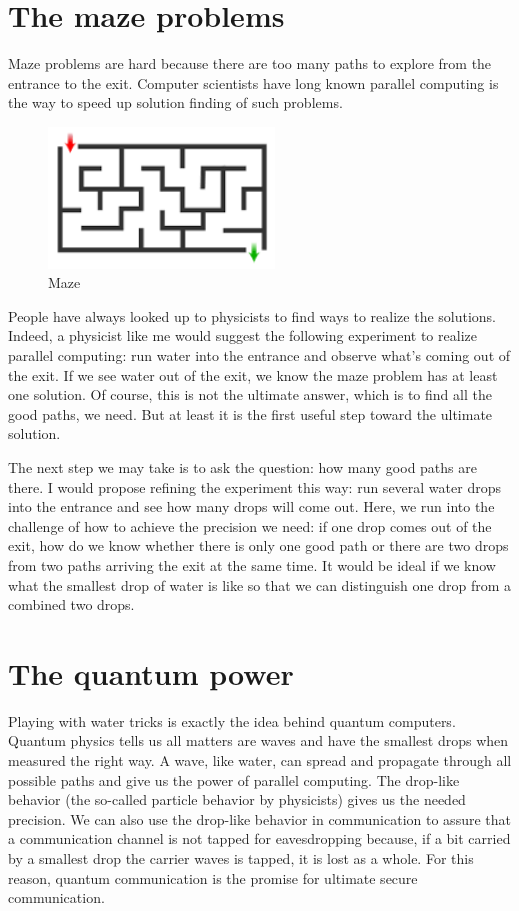 \documentclass{book}
\begin{document}
\section{The maze problems}
Maze problems are hard because there are too many paths to explore from the entrance to the exit. Computer scientists have long known parallel computing is the way to speed up solution finding of such problems.

\begin{figure}[ht]
\includegraphics[width=6cm]{maze.png}
\caption{Maze}
\label{Maze}
\end{figure}

People have always looked up to physicists to find ways to realize the solutions. Indeed, a physicist like me would suggest the following experiment to realize parallel computing: run water into the entrance and observe what's coming out of the exit. If we see water out of the exit, we know the maze problem has at least one solution. Of course, this is not the ultimate answer, which is to find all the good paths, we need. But at least it is the first useful step toward the ultimate solution.

The next step we may take is to ask the question: how many good paths are there. I would propose refining the experiment this way: run several water drops into the entrance and see how many drops will come out. Here, we run into the challenge of how to achieve the precision we need: if one drop comes out of the exit, how do we know whether there is only one good path or there are two drops from two paths arriving the exit at the same time. It would be ideal if we know what the smallest drop of water is like so that we can distinguish one drop from a combined two drops.

\section{The quantum power}
Playing with water tricks is exactly the idea behind quantum computers. Quantum physics tells us all matters are waves and have the smallest drops when measured the right way. A wave, like water, can spread and propagate through all possible paths and give us the power of parallel computing. The drop-like behavior (the so-called particle behavior by physicists) gives us the needed precision. We can also use the drop-like behavior in communication to assure that a communication channel is not tapped for eavesdropping because, if a bit carried by a smallest drop the carrier waves is tapped, it is lost as a whole. For this reason, quantum communication is the promise for ultimate secure communication.
\end{document}
